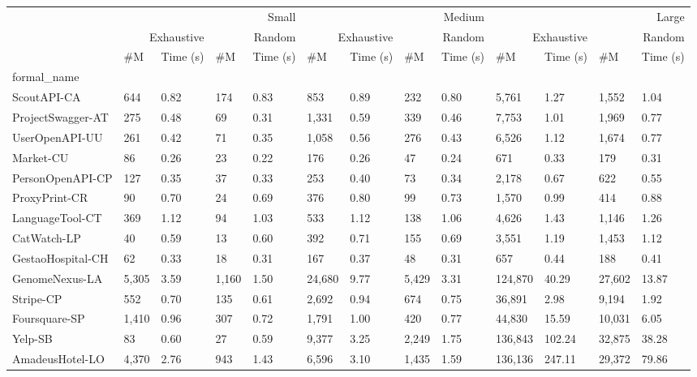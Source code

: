 \begin{tabular}{lllllllllllll}
\toprule
 & \multicolumn{4}{r}{Small} & \multicolumn{4}{r}{Medium} & \multicolumn{4}{r}{Large} \\
 & \multicolumn{2}{r}{Exhaustive} & \multicolumn{2}{r}{Random} & \multicolumn{2}{r}{Exhaustive} & \multicolumn{2}{r}{Random} & \multicolumn{2}{r}{Exhaustive} & \multicolumn{2}{r}{Random} \\
 & \#M & Time (s) & \#M & Time (s) & \#M & Time (s) & \#M & Time (s) & \#M & Time (s) & \#M & Time (s) \\
formal_name &  &  &  &  &  &  &  &  &  &  &  &  \\
\midrule
ScoutAPI-CA & 644 & 0.82 & 174 & 0.83 & 853 & 0.89 & 232 & 0.80 & 5,761 & 1.27 & 1,552 & 1.04 \\
ProjectSwagger-AT & 275 & 0.48 & 69 & 0.31 & 1,331 & 0.59 & 339 & 0.46 & 7,753 & 1.01 & 1,969 & 0.77 \\
UserOpenAPI-UU & 261 & 0.42 & 71 & 0.35 & 1,058 & 0.56 & 276 & 0.43 & 6,526 & 1.12 & 1,674 & 0.77 \\
Market-CU & 86 & 0.26 & 23 & 0.22 & 176 & 0.26 & 47 & 0.24 & 671 & 0.33 & 179 & 0.31 \\
PersonOpenAPI-CP & 127 & 0.35 & 37 & 0.33 & 253 & 0.40 & 73 & 0.34 & 2,178 & 0.67 & 622 & 0.55 \\
ProxyPrint-CR & 90 & 0.70 & 24 & 0.69 & 376 & 0.80 & 99 & 0.73 & 1,570 & 0.99 & 414 & 0.88 \\
LanguageTool-CT & 369 & 1.12 & 94 & 1.03 & 533 & 1.12 & 138 & 1.06 & 4,626 & 1.43 & 1,146 & 1.26 \\
CatWatch-LP & 40 & 0.59 & 13 & 0.60 & 392 & 0.71 & 155 & 0.69 & 3,551 & 1.19 & 1,453 & 1.12 \\
GestaoHospital-CH & 62 & 0.33 & 18 & 0.31 & 167 & 0.37 & 48 & 0.31 & 657 & 0.44 & 188 & 0.41 \\
GenomeNexus-LA & 5,305 & 3.59 & 1,160 & 1.50 & 24,680 & 9.77 & 5,429 & 3.31 & 124,870 & 40.29 & 27,602 & 13.87 \\
Stripe-CP & 552 & 0.70 & 135 & 0.61 & 2,692 & 0.94 & 674 & 0.75 & 36,891 & 2.98 & 9,194 & 1.92 \\
Foursquare-SP & 1,410 & 0.96 & 307 & 0.72 & 1,791 & 1.00 & 420 & 0.77 & 44,830 & 15.59 & 10,031 & 6.05 \\
Yelp-SB & 83 & 0.60 & 27 & 0.59 & 9,377 & 3.25 & 2,249 & 1.75 & 136,843 & 102.24 & 32,875 & 38.28 \\
AmadeusHotel-LO & 4,370 & 2.76 & 943 & 1.43 & 6,596 & 3.10 & 1,435 & 1.59 & 136,136 & 247.11 & 29,372 & 79.86 \\

\end{tabular}
